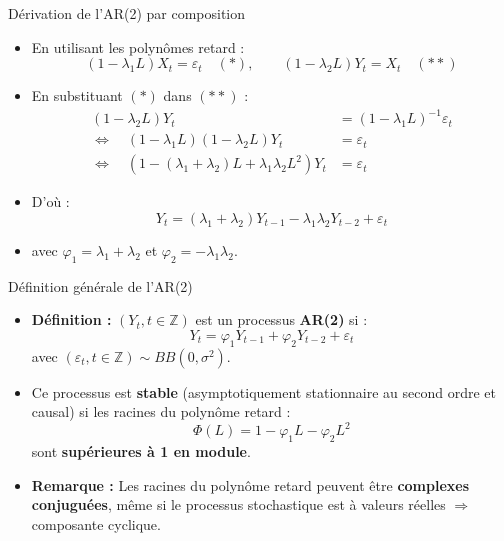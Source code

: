 \documentclass[11pt,aspectratio=169]{beamer}
\newcommand{\Z}{\mathbb{Z}}
\begin{document}
\begin{frame}{Dérivation de l'AR(2) par composition}

\begin{itemize}

\item En utilisant les polynômes retard :
\[
(1 - \lambda_1 L) X_t = \varepsilon_t \quad (*), \qquad (1 - \lambda_2 L) Y_t = X_t \quad (**)
\]

\item En substituant $(*)$ dans $(**)$ :
\begin{align*}
(1 - \lambda_2 L) Y_t &= (1 - \lambda_1 L)^{-1} \varepsilon_t \\
\Leftrightarrow \quad (1 - \lambda_1 L)(1 - \lambda_2 L) Y_t &= \varepsilon_t \\
\Leftrightarrow \quad (1 - (\lambda_1 + \lambda_2) L + \lambda_1 \lambda_2 L^2) Y_t &= \varepsilon_t
\end{align*}

\item D'où :
\[
Y_t = (\lambda_1 + \lambda_2) Y_{t-1} - \lambda_1 \lambda_2 Y_{t-2} + \varepsilon_t
\]

\item avec $\varphi_1 = \lambda_1 + \lambda_2$ et $\varphi_2 = -\lambda_1 \lambda_2$.

\end{itemize}
\end{frame}

\begin{frame}{Définition générale de l'AR(2)}

\begin{itemize}

\item \textbf{Définition :} $(Y_t, t \in \Z)$ est un processus \textbf{AR(2)} si :
\[
Y_t = \varphi_1 Y_{t-1} + \varphi_2 Y_{t-2} + \varepsilon_t
\]
avec $(\varepsilon_t, t \in \Z) \sim BB(0, \sigma^2)$.\newline

\item Ce processus est \textbf{stable} (asymptotiquement stationnaire au second ordre et causal) si les racines du polynôme retard :
\[
\Phi(L) = 1 - \varphi_1 L - \varphi_2 L^2
\]
sont \textbf{supérieures à 1 en module}.\newline

\item \textbf{Remarque :} Les racines du polynôme retard peuvent être \textbf{complexes conjuguées}, même si le processus stochastique est à valeurs réelles $\Rightarrow$ composante cyclique.

\end{itemize}
\end{frame}
\end{document}
